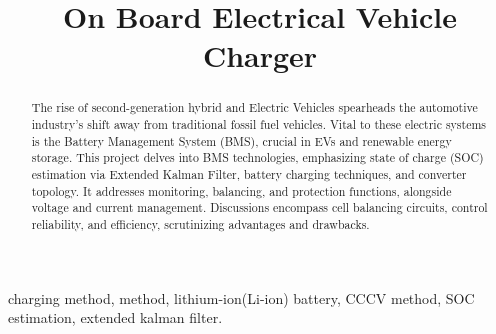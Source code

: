 \documentclass[conference]{IEEEtran}
\begin{document}
\title{On Board Electrical Vehicle Charger}
\author{
\and
{}
\and
{}
}


\maketitle

\begin{abstract}
The rise of second-generation hybrid and Electric Vehicles spearheads the automotive industry's shift away from traditional fossil fuel vehicles. Vital to these electric systems is the Battery Management System (BMS), crucial in EVs and renewable energy storage. This project delves into BMS technologies, emphasizing state of charge (SOC) estimation via Extended Kalman Filter, battery charging techniques, and converter topology. It addresses monitoring, balancing, and protection functions, alongside voltage and current management. Discussions encompass cell balancing circuits, control reliability, and efficiency, scrutinizing advantages and drawbacks.
\end{abstract}

\begin{IEEEkeywords}
charging method, method, lithium-ion(Li-ion) battery, CCCV method, SOC estimation, extended kalman filter.
\end{IEEEkeywords}
\end{document}
